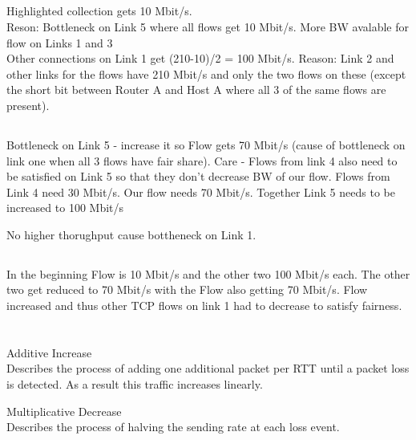 \documentclass{article}
\begin{document}
 \subsection{}

 Highlighted collection gets 10 Mbit/s.\\
 Reson: Bottleneck on Link 5 where all flows get 10 Mbit/s.
 More BW avalable for flow on Links 1 and 3\\
 Other connections on Link 1 get (210-10)/2 = 100 Mbit/s.
 Reason: Link 2 and other links for the flows have 210 Mbit/s and only the two flows on these (except the short bit between Router A and Host A where all 3 of the same flows are present).


 \subsection{}

 Bottleneck on Link 5 - increase it so Flow gets 70 Mbit/s (cause of bottleneck on link one when all 3 flows have fair share).
 Care - Flows from link 4 also need to be satisfied on Link 5 so that they don't decrease BW of our flow.
 Flows from Link 4 need 30 Mbit/s. Our flow needs 70 Mbit/s. Together Link 5 needs to be increased to 100 Mbit/s

 No higher thorughput cause bottheneck on Link 1.

    \subsection{}
 In the beginning Flow is 10 Mbit/s and the other two 100 Mbit/s each.
 The other two get reduced to 70 Mbit/s with the Flow also getting 70 Mbit/s.
 Flow increased and thus other TCP flows on link 1 had to decrease to satisfy fairness.





    
    \section{}
    \subsection{}
    Additive Increase\\
    Describes the process of adding one additional packet per RTT until a packet loss is detected. As a result this traffic increases linearly. 
    
    Multiplicative Decrease\\
    Describes the process of halving the sending rate at each loss event.
\end{document}
